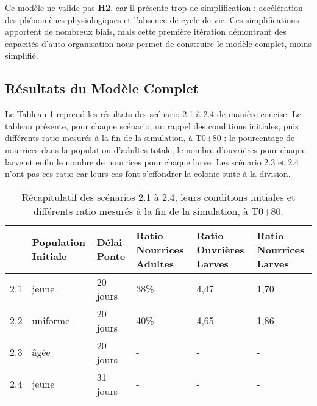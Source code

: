 		Ce modèle ne valide pas \textbf{H2}, car il présente trop de simplification : accélération des phénomènes physiologiques et l'absence de cycle de vie. Ces simplifications apportent de nombreux biais, mais cette première itération démontrant des capacités d'auto-organisation nous permet de construire le modèle complet, moins simplifié.
	
	\subsection{Résultats du Modèle Complet}		
		
		Le Tableau \ref{TabComplet} reprend les résultats des scénario 2.1 à 2.4 de manière concise. Le tableau présente, pour chaque scénario, un rappel des conditions initiales, puis différents ratio mesurés à la fin de la simulation, à T0+80 : le pourcentage de nourrices dans la population d'adultes totale, le nombre d'ouvrières pour chaque larve et enfin le nombre de nourrices pour chaque larve. Les scénario 2.3 et 2.4 n'ont pas ces ratio car leurs cas font s'effondrer la colonie suite à la division.
		\begin{table}
		\centering
		\begin{tabularx}{\textwidth}{l|p{2cm}|p{1.5cm}|X|X|X}
    	& Population \newline Initiale & Délai Ponte & Ratio Nourrices Adultes & Ratio Ouvrières Larves & Ratio Nourrices Larves\\
   		\hline
   		2.1 & jeune & 20 jours & 38\% & 4,47 & 1,70 \\
   		2.2 & uniforme & 20 jours & 40\% & 4,65 & 1,86 \\
   		2.3 & âgée & 20 jours &-&-&-\\
   		2.4 & jeune & 31 jours &-&-&-\\
		\end{tabularx}	
		\caption{Récapitulatif des scénarios 2.1 à 2.4, leurs conditions initiales et différents ratio mesurés à la fin de la simulation, à T0+80.}	
   		\label{TabComplet}
	\end{table}	
		
